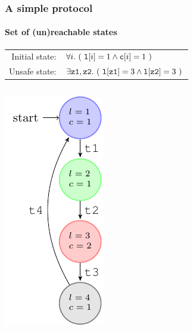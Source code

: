 \begin{frame}[fragile]
  \frametitle{A simple protocol}
  \framesubtitle{Set of (un)reachable states}

\begin{tabular}{rl}
Initial state: & $\forall i.\ (\ {\tt l}[i] = 1 \wedge {\tt c}[i] = 1\ )$ \\
 Unsafe state: & $\exists {\tt z1}, {\tt z2}.\ (\ {\tt l[z1]}=3 \wedge {\tt l[z2]}=3\ )$ \\
\end{tabular}

\vfill

\begin{columns}

\begin{column}{.3\textwidth}
\begin{overlayarea}{\textwidth}{7cm}
\includegraphics[scale=.8]{pictures/demo-prot2-s-fig}
\end{overlayarea}
\end{column}


\end{columns}
\end{frame}
